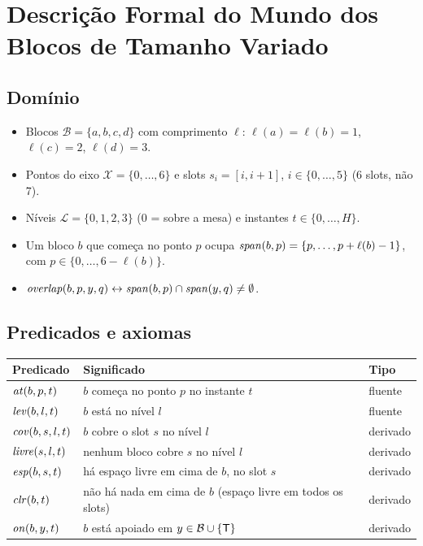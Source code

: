 \section{Descrição Formal do Mundo dos Blocos de Tamanho Variado}
\label{sec:formal}

\subsection{Domínio}

\begin{itemize}
	\item Blocos $\mathcal{B}=\{a,b,c,d\}$ com comprimento $\ell$:
	$\ell(a)=\ell(b)=1$, $\ell(c)=2$, $\ell(d)=3$.
	\item Pontos do eixo $\mathcal{X}=\{0,\dots,6\}$ e slots $s_i=[i,i+1]$,
	$i\in\{0,\dots,5\}$ (6 slots, não 7).
	\item Níveis $\mathcal{L}=\{0,1,2,3\}$ ($0$ = sobre a mesa) e instantes $t\in\{0,\dots,H\}$.
	\item Um bloco $b$ que começa no ponto $p$ ocupa
	$\mathit{span}(b,p)=\{p,\dots,p+\ell(b)-1\}$, com $p\in\{0,\dots,6-\ell(b)\}$.
	\item $\mathit{overlap}(b,p,y,q) \leftrightarrow \mathit{span}(b,p)\cap\mathit{span}(y,q)\neq\emptyset$.
\end{itemize}

\subsection{Predicados e axiomas}

\begin{center}
	\begin{tabular}{@{}lll@{}}
		\toprule
		Predicado & Significado & Tipo\\
		\midrule
		$\mathit{at}(b,p,t)$ & $b$ começa no ponto $p$ no instante $t$ & fluente\\
		$\mathit{lev}(b,l,t)$ & $b$ está no nível $l$ & fluente\\
		$\mathit{cov}(b,s,l,t)$ & $b$ cobre o slot $s$ no nível $l$ & derivado\\
		$\mathit{livre}(s,l,t)$ & nenhum bloco cobre $s$ no nível $l$ & derivado\\
		$\mathit{esp}(b,s,t)$ & há espaço livre em cima de $b$, no slot $s$ & derivado\\
		$\mathit{clr}(b,t)$ & não há nada em cima de $b$ (espaço livre em todos os slots) & derivado\\
		$\mathit{on}(b,y,t)$ & $b$ está apoiado em $y\in\mathcal{B}\cup\{\mathsf{T}\}$ & derivado\\
		\bottomrule
	\end{tabular}
\end{center}

